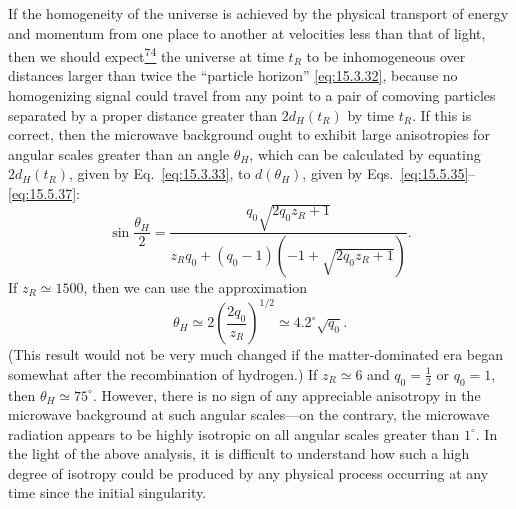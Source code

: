 If the homogeneity of the universe is achieved by the physical transport of
energy and momentum from one place to another at velocities less than that of
light, then we should expect\hyperref[ch15-ref-74]{\textsuperscript{74}} the
universe at time \(t_R\) to be inhomogeneous over distances larger than twice
the ``particle horizon'' \eqref{eq:15.3.32}, because no homogenizing signal
could travel from any point to a pair of comoving particles separated by a
proper distance greater than \(2d_H(t_R)\) by time \(t_R\). If this is
correct, then the microwave background ought to exhibit large anisotropies for
angular scales greater than an angle \(\theta_H\), which can be calculated by
equating \(2d_H(t_R)\), given by Eq.~\eqref{eq:15.3.33}, to
\(d(\theta_H)\), given by Eqs.~\eqref{eq:15.5.35}--\eqref{eq:15.5.37}:
\begin{equation}
  \sin\frac{\theta_H}{2}
  =
  \frac{q_0\sqrt{2q_0z_R+1}}
  {z_Rq_0+(q_0-1)(-1+\sqrt{2q_0z_R+1})}.
  \tag{15.5.38}\label{eq:15.5.38}
\end{equation}
If \(z_R\simeq1500\), then we can use the approximation
\begin{equation}
  \theta_H
  \simeq
  2\left(\frac{2q_0}{z_R}\right)^{1/2}
  \simeq
  4.2^\circ\sqrt{q_0}.
  \tag{15.5.39}\label{eq:15.5.39}
\end{equation}
(This result would not be very much changed if the matter-dominated era began
somewhat after the recombination of hydrogen.) If \(z_R\simeq6\) and
\(q_0=\tfrac12\) or \(q_0=1\), then \(\theta_H\simeq75^\circ\). However,
there is no sign of any appreciable anisotropy in the microwave background at
such angular scales---on the contrary, the microwave radiation appears to be
highly isotropic on all angular scales greater than \(1^\circ\). In the light
of the above analysis, it is difficult to understand how such a high degree of
isotropy could be produced by any physical process occurring at any time since
the initial singularity.

